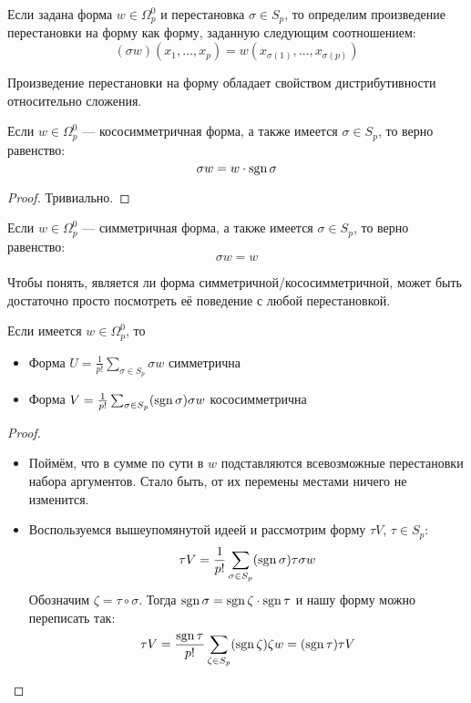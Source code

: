 \begin{definition}
	Если задана форма $w \in \Omega_p^0$ и перестановка $\sigma \in S_p$, то определим произведение перестановки на форму как форму, заданную следующим соотношением:
	\[
		(\sigma w)(x_1, \ldots, x_p) = w(x_{\sigma(1)}, \ldots, x_{\sigma(p)})
	\]
\end{definition}

\begin{note}
	Произведение перестановки на форму обладает свойством дистрибутивности относительно сложения.
\end{note}

\begin{proposition}
	Если $w \in \Omega_p^0$ --- кососимметричная форма, а также имеется $\sigma \in S_p$, то верно равенство:
	\[
		\sigma w = w \cdot \operatorname{sgn} \sigma
	\]
\end{proposition}

\begin{proof}
	Тривиально.
\end{proof}

\begin{proposition}
	Если $w \in \Omega_p^0$ --- симметричная форма, а также имеется $\sigma \in S_p$, то верно равенство:
	\[
		\sigma w = w
	\]
\end{proposition}

\begin{note}
	Чтобы понять, является ли форма симметричной/кососимметричной, может быть достаточно просто посмотреть её поведение с любой перестановкой.
\end{note}

\begin{proposition}
	Если имеется $w \in \Omega_p^0$, то
	\begin{itemize}
		\item Форма $U = \frac{1}{p!} \sum_{\sigma \in S_p} \sigma w$ симметрична
		
		\item Форма $V = \frac{1}{p!} \sum_{\sigma \in S_p} (\operatorname{sgn} \sigma) \sigma w$ кососимметрична
	\end{itemize}
\end{proposition}

\begin{proof}~
	\begin{itemize}
		\item Поймём, что в сумме по сути в $w$ подставляются всевозможные перестановки набора аргументов. Стало быть, от их перемены местами ничего не изменится.
		
		\item Воспользуемся вышеупомянутой идеей и рассмотрим форму $\tau V$, $\tau \in S_p$:
		\[
		\tau V = \frac{1}{p!} \sum_{\sigma \in S_p} (\operatorname{sgn} \sigma) \tau \sigma w
		\]
		Обозначим $\zeta = \tau \circ \sigma$. Тогда $\operatorname{sgn} \sigma = \operatorname{sgn} \zeta \cdot \operatorname{sgn} \tau$ и нашу форму можно переписать так:
		\[
		\tau V = \frac{\operatorname{sgn} \tau}{p!} \sum_{\zeta \in S_p} (\operatorname{sgn} \zeta) \zeta w = (\operatorname{sgn} \tau) \tau V
		\]
	\end{itemize}
\end{proof}

